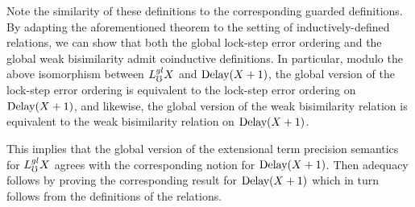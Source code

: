 %
Note the similarity of these definitions to the corresponding guarded definitions.
By adapting the aforementioned theorem to the setting of inductively-defined relations,
we can show that both the global lock-step error ordering and the global weak bisimilarity
admit coinductive definitions. In particular, modulo the above isomorphism
between $L_\mho^{gl} X$ and $\text{Delay}(X+1)$, the global version of the lock-step
error ordering is equivalent to the lock-step error ordering on $\text{Delay}(X + 1)$,
and likewise, the global version of the weak bisimilarity relation is equivalent to the
weak bisimilarity relation on $\text{Delay}(X + 1)$.

This implies that the global version of the extensional term precision semantics for
$L_\mho^{gl} X$ agrees with the corresponding notion for $\text{Delay}(X + 1)$.
Then adequacy follows by proving the corresponding
result for $\text{Delay}(X + 1)$ which in turn follows from the definitions of the relations.



